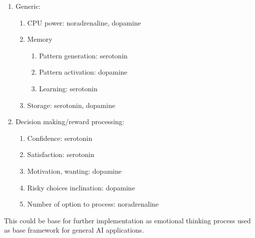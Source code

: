 \begin{enumerate}
\item  Generic:
\begin{enumerate}
\item  CPU power: noradrenaline, dopamine
\item  Memory
\begin{enumerate}
\item  Pattern generation: serotonin
\item  Pattern activation: dopamine
\item  Learning: serotonin
\end{enumerate}
\item  Storage: serotonin, dopamine
\end{enumerate}
\item  Decision making/reward processing:
\begin{enumerate}
\item  Confidence: serotonin
\item  Satisfaction: serotonin
\item  Motivation, wanting: dopamine
\item  Risky choices inclination: dopamine
\item  Number of option to process: noradrenaline
\end{enumerate}
\end{enumerate}

This could be base for further implementation as emotional thinking process used as base framework for general AI applications.
